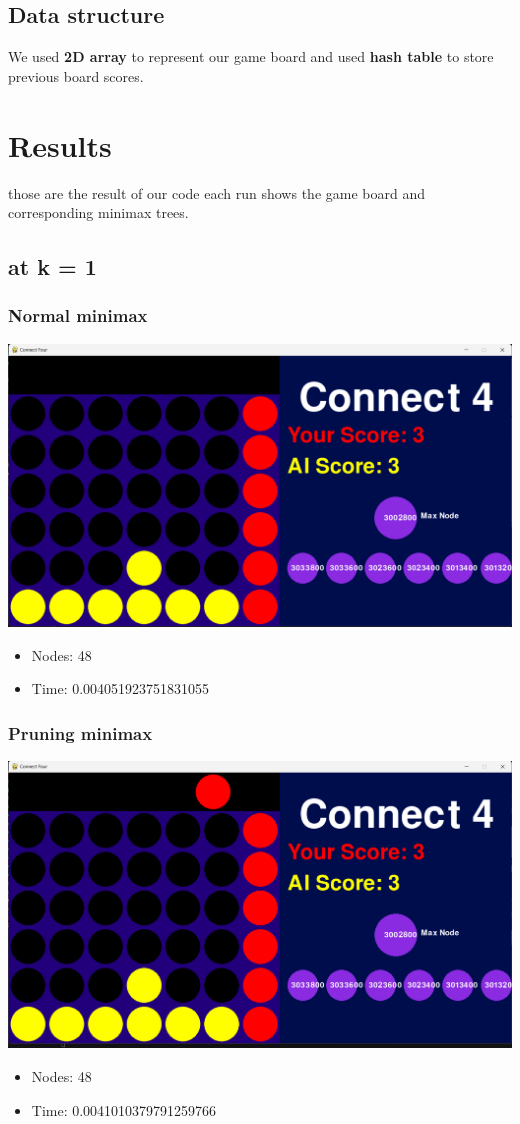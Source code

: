 \documentclass{article}
\begin{document}
\subsection*{Data structure}
We used \textbf{2D array} to represent our game board and used \textbf{hash table} to store previous board scores.  

\section{Results}
those are the result of our code each run shows the game board and corresponding minimax trees.
\subsection*{at k = 1}
\subsubsection*{Normal minimax}
\begin{center}
    \includegraphics[width=0.8\linewidth]{testcase.png}
\end{center}
\begin{itemize}
    \item Nodes: 48
    \item Time: 0.004051923751831055
\end{itemize}
\subsubsection*{Pruning minimax}
\begin{center}
    \includegraphics[width=0.8\linewidth]{pruning1.png}
\end{center}
\begin{itemize}
    \item Nodes: 48
    \item Time: 0.0041010379791259766
\end{itemize}
\end{document}
